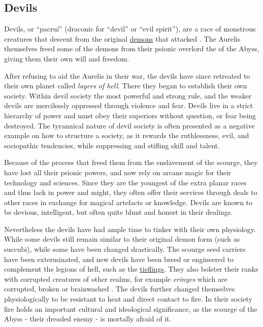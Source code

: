 \subsection{Devils}
\label{sec:Devils}

Devils, or ``pacru\'i'' (draconic for ``devil'' or ``evil spirit''), are a
race of monstrous creatures that descent from the original
\hyperref[sec:Demons]{demons} that attacked . The Aurelis
themselves freed some of the demons from their psionic overlord the
 of the Abyss, giving them their own will and freedom.

After refusing to aid the Aurelis in their war, the devils have since
retreated to their own planet called \emph{layers of hell}. There they began to
establish their own society. Within devil society the most powerful and strong
rule, and the weaker devils are mercilessly oppressed through violence and
fear. Devils live in a strict hierarchy of power and must obey their
superiors without question, or fear being destroyed. The tyrannical nature of
devil society is often presented as a negative example on how to structure a
society, as it rewards the ruthlessness, evil, and sociopathic tendencies,
while suppressing and stifling skill and talent.

Because of the process that freed them from the enslavement of the scourge,
they have lost all their psionic powers, and now rely on arcane magic for
their technology and sciences. Since they are the youngest of the extra planar
races and thus lack in power and might, they often offer their services
through deals to other races in exchange for magical artefacts or
knowledge. Devils are known to be devious, intelligent, but often quite blunt
and honest in their dealings.

Nevertheless the devils have had ample time to tinker with their own
physiology. While some devils still remain similar to their original demon
form (such as succubi), while some have been changed drastically. The scourge
seed carriers have been exterminated, and new devils have been breed or
engineered to complement the legions of hell, such as the
\hyperref[sec:Tieflings]{tieflings}. They also bolster their ranks with
corrupted creatures of other realms, for example \emph{erinyes} which are
corrupted, broken or brainwashed . The devils further
changed themselves physiologically to be resistant to heat and direct contact
to fire. In their society fire holds an important cultural and ideological
significance, as the scourge of the Abyss - their dreaded enemy - is mortally
afraid of it.

